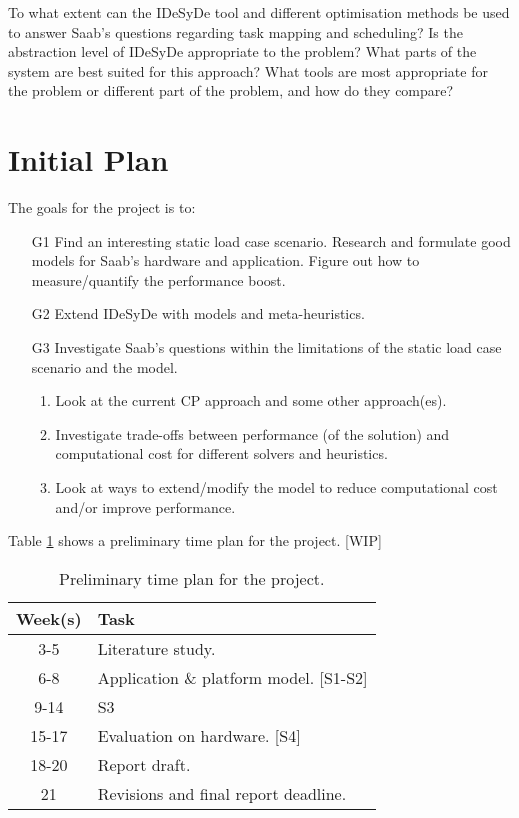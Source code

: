 \documentclass[12pt,notitlepage]{article}
\begin{document}
To what extent can the IDeSyDe tool and different optimisation methods be used to answer Saab's questions regarding task mapping and scheduling? Is the abstraction level of IDeSyDe appropriate to the problem? What parts of the system are best suited for this approach? What tools are most appropriate for the problem or different part of the problem, and how do they compare?

\section{Initial Plan}
The goals for the project is to:
\begin{enumerate}
	\item[G1] Find an interesting static load case scenario. Research and formulate good models for Saab's hardware and application. Figure out how to measure/quantify the performance boost.
	\item[G2] Extend IDeSyDe with models and meta-heuristics.
	\item[G3] Investigate Saab's questions within the limitations of the static load case scenario and the model.
	\begin{enumerate}
		\item Look at the current CP approach and some other approach(es).
		\item Investigate trade-offs between performance (of the solution) and computational cost for different solvers and heuristics.
		\item Look at ways to extend/modify the model to reduce computational cost and/or improve performance.
	\end{enumerate}
\end{enumerate}

Table \ref{timeplan} shows a preliminary time plan for the project. [WIP]

\begin{table}[H]
	\centering
	\begin{tabular}{c|l}
		Week(s) & Task \\
		\hline
		3-5 & Literature study. \\
		6-8 & Application \& platform model. [S1-S2] \\
		9-14 & S3 \\
		15-17 & Evaluation on hardware. [S4] \\
		18-20 & Report draft. \\
		21 & Revisions and final report deadline.
	\end{tabular}
    \caption{Preliminary time plan for the project.}
	\label{timeplan}
\end{table}
\end{document}
